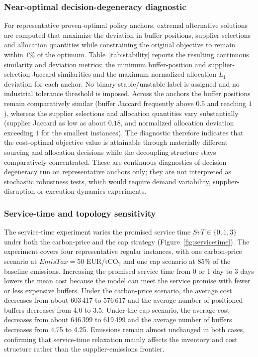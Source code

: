 \documentclass[preprint,12pt,authoryear]{elsarticle}
\begin{document}
\subsubsection{Near-optimal decision-degeneracy diagnostic}
For representative proven-optimal policy anchors, extremal alternative solutions are computed that maximize the deviation in buffer positions, supplier selections and allocation quantities while constraining the original objective to remain within $1\%$ of the optimum. Table~\ref{tab:stability} reports the resulting continuous similarity and deviation metrics: the minimum buffer-position and supplier-selection Jaccard similarities and the maximum normalized allocation $L_{1}$ deviation for each anchor. No binary stable/unstable label is assigned and no industrial tolerance threshold is imposed. Across the anchors the buffer positions remain comparatively similar (buffer Jaccard frequently above $0.5$ and reaching $1$), whereas the supplier selections and allocation quantities vary substantially (supplier Jaccard as low as about $0.18$, and normalized allocation deviation exceeding $1$ for the smallest instances). The diagnostic therefore indicates that the cost-optimal objective value is attainable through materially different sourcing and allocation decisions while the decoupling structure stays comparatively concentrated. These are continuous diagnostics of decision degeneracy run on representative anchors only; they are not interpreted as stochastic robustness tests, which would require demand variability, supplier-disruption or execution-dynamics experiments.



\subsubsection{Service-time and topology sensitivity}
The service-time experiment varies the promised service time $SvT\in\{0,1,3\}$ under both the carbon-price and the cap strategy (Figure~\ref{fig:servicetime}). The experiment covers four representative regular instances, with one carbon-price scenario at $EmisTax=50$ EUR/tCO$_2$ and one cap scenario at $85\%$ of the baseline emissions. Increasing the promised service time from 0 or 1 day to 3 days lowers the mean cost because the model can meet the service promise with fewer or less expensive buffers. Under the carbon-price scenario, the average cost decreases from about 603\,417 to 576\,617 and the average number of positioned buffers decreases from 4.0 to 3.5. Under the cap scenario, the average cost decreases from about 646\,399 to 619\,499 and the average number of buffers decreases from 4.75 to 4.25. Emissions remain almost unchanged in both cases, confirming that service-time relaxation mainly affects the inventory and cost structure rather than the supplier-emissions frontier.
\end{document}
